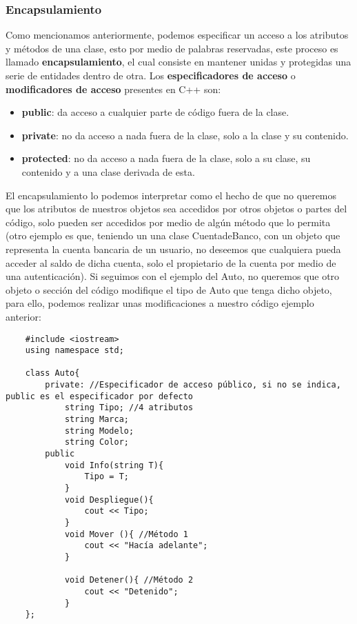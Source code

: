\subsubsection{Encapsulamiento}
Como mencionamos anteriormente, podemos especificar un acceso a los atributos y métodos de una clase, esto por medio de palabras reservadas, este proceso es llamado \textbf{encapsulamiento}, el cual consiste en mantener unidas y protegidas una serie de entidades dentro de otra. Los \textbf{especificadores de acceso} o \textbf{modificadores de acceso} presentes en C++ son:
\begin{itemize}
    \item \textbf{public}: da acceso a cualquier parte de código fuera de la clase.
    \item \textbf{private}: no da acceso a nada fuera de la clase, solo a la clase y su contenido.
    \item \textbf{protected}: no da acceso a nada fuera de la clase, solo a su clase, su contenido y a una clase derivada de esta.
\end{itemize}
El encapsulamiento lo podemos interpretar como el hecho de que no queremos que los atributos de nuestros objetos sea accedidos por otros objetos o partes del código, solo pueden ser accedidos por medio de algún método que lo permita (otro ejemplo es que, teniendo un una clase CuentadeBanco, con un objeto que representa la cuenta bancaria de un usuario, no deseemos que cualquiera pueda acceder al saldo de dicha cuenta, solo el propietario de la cuenta por medio de una autenticación). Si seguimos con el ejemplo del Auto, no queremos que otro objeto o sección del código modifique el tipo de Auto que tenga dicho objeto, para ello, podemos realizar unas modificaciones a nuestro código ejemplo anterior:
\begin{lstlisting}
    #include <iostream>
    using namespace std;
    
    class Auto{
        private: //Especificador de acceso público, si no se indica, public es el especificador por defecto
            string Tipo; //4 atributos
            string Marca;
            string Modelo;
            string Color;
        public
            void Info(string T){
                Tipo = T;
            }
            void Despliegue(){
                cout << Tipo;
            }
            void Mover (){ //Método 1
                cout << "Hacía adelante";
            }
            
            void Detener(){ //Método 2
                cout << "Detenido";
            }
    };
\end{lstlisting}
